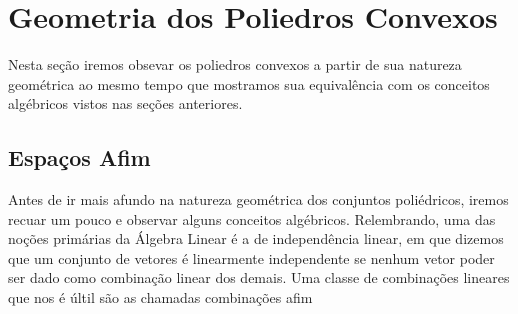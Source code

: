 \newtheorem{def:convex hull}[def:conjunto convexo]{Definição}
\newtheorem{def:independencia convexa}[def:conjunto convexo]{Definição}
\newtheorem{def:simplex}[def:conjunto convexo]{Definição}
\newtheorem{def:combinação afim}[def:conjunto convexo]{Definição}

\newtheorem{prop:redundancia}[prop:combinação convexa]{Proposição}
\newtheorem{prop:pontos extremos na fronteira}[prop:combinação convexa]{Proposição}
\newtheorem{prop:conjuntos convexos fechados}[prop:combinação convexa]{Proposição}
\newtheorem{prop:conjuntos convexos limitados}[prop:combinação convexa]{Proposição}

\newtheorem{lemma:afim}{Lema}[chapter]
\newtheorem{lemma:dentro ou fora}{Lema}[chapter]

\newtheorem{thm:caratheodory}{Teorema}[chapter]
\newtheorem{thm:conjuntos convexos compactos}[thm:caratheodory]{Teorema}

\newtheorem{cor:caratheodory}{Corolário}[chapter]

\section{Geometria dos Poliedros Convexos}

Nesta seção iremos obsevar os poliedros convexos a partir de sua
natureza geométrica ao mesmo tempo que mostramos sua equivalência com
os conceitos algébricos vistos nas seções anteriores.

\subsection{Espaços Afim}

Antes de ir mais afundo na natureza geométrica dos conjuntos
poliédricos, iremos recuar um pouco e observar alguns conceitos
algébricos. Relembrando, uma das noções primárias da Álgebra Linear é a de
independência linear, em que dizemos que um conjunto de vetores
é linearmente independente se nenhum vetor poder ser dado
como combinação linear dos demais. Uma classe de combinações
lineares que nos é últil são as chamadas combinações afim

